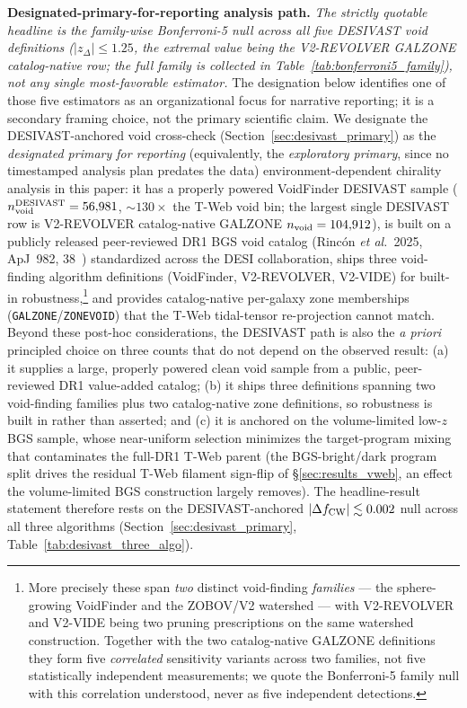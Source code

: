 \documentclass[aps,prd,twocolumn,superscriptaddress,showpacs,preprintnumbers,nofootinbib,longbibliography,floatfix]{revtex4-2}
\begin{document}
\textbf{Designated-primary-for-reporting analysis path.}
\emph{The strictly quotable headline is the family-wise Bonferroni-5
null across all five DESIVAST void definitions
($|z_\Delta|\!\le\!1.25$, the extremal value being the V2-REVOLVER
GALZONE catalog-native row; the full family is collected in
Table~\ref{tab:bonferroni5_family}), not
any single most-favorable estimator.} The designation below identifies
one of those five estimators as an organizational focus for narrative
reporting; it is a secondary framing choice, not the primary scientific
claim.
We designate the DESIVAST-anchored void cross-check
(Section~\ref{sec:desivast_primary}) as the
\emph{designated primary for reporting} (equivalently, the
\emph{exploratory primary}, since no timestamped analysis plan predates
the data) environment-dependent chirality analysis in this paper:
it has a properly powered VoidFinder DESIVAST sample ($n_{\rm void}^{\rm DESIVAST} =
56{,}981$, ${\sim}130\times$ the T-Web void bin; the largest single DESIVAST row
is V2-REVOLVER catalog-native GALZONE $n_{\rm void}=104{,}912$), is built on a
publicly released peer-reviewed
DR1 BGS void catalog (Rinc\'on \textit{et al.}\ 2025,
ApJ~982, 38~\cite{DESIVAST2025}) standardized across the
DESI collaboration, ships three void-finding algorithm
definitions (VoidFinder, V2-REVOLVER, V2-VIDE) for built-in
robustness,\footnote{More precisely these span \emph{two} distinct
void-finding \emph{families} --- the sphere-growing VoidFinder and the
ZOBOV/V2 watershed --- with V2-REVOLVER and V2-VIDE being two pruning
prescriptions on the same watershed construction. Together with the two
catalog-native GALZONE definitions they form five \emph{correlated}
sensitivity variants across two families, not five statistically
independent measurements; we quote the Bonferroni-5 family null with
this correlation understood, never as five independent detections.}
and
provides catalog-native per-galaxy zone memberships
(\texttt{GALZONE}/\texttt{ZONEVOID}) that the T-Web tidal-tensor
re-projection cannot match. Beyond these post-hoc considerations, the
DESIVAST path is also the \emph{a priori} principled choice on three
counts that do not depend on the observed result: (a) it supplies a
large, properly powered clean void sample from a public, peer-reviewed
DR1 value-added catalog; (b) it ships three definitions spanning two
void-finding families plus two catalog-native zone definitions, so robustness is
built in rather than asserted; and (c) it is anchored on the
volume-limited low-$z$ BGS sample, whose near-uniform selection
minimizes the target-program mixing that contaminates the full-DR1
T-Web parent (the BGS-bright/dark program split drives the residual
T-Web filament sign-flip of \S\ref{sec:results_vweb}, an effect the
volume-limited BGS construction largely removes). The headline-result statement therefore
rests on the DESIVAST-anchored $|\Delta f_{\rm CW}| \lesssim 0.002$ null
across all three algorithms (Section~\ref{sec:desivast_primary},
Table~\ref{tab:desivast_three_algo}).
\end{document}
